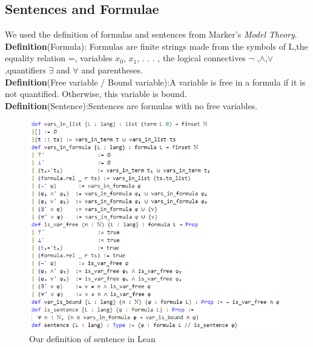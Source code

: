 \documentclass[landscape]{sciposter}
\begin{document}
\begin{multicols}{4}
\section*{Sentences and Formulae}
We used the definition of formulas and sentences from Marker's \textit{Model Theory}.\\
\textbf{Definition}(Formula): Formulas are finite strings made from the symbols of L,the equality relation =,  variables $x_0$, $x_1$, . . . , the logical connectives $\lnot$ ,$\wedge$,$\lor$,quantifiers $\exists$ and $\forall$ and parentheses.\\

\textbf{Definition}(Free variable / Bound variable):A variable is free in a formula if it is not quantified. Otherwise, this variable is bound.\\


\textbf{Definition}(Sentence):Sentences are formulas with no free variables.\\
\begin{center}\begin{figure}
\includegraphics[height = 9 in, width=1\textwidth, left]{sentence.png}
 	\caption{Our definition of sentence in Lean}


\end{figure}
\end{center}
\end{multicols}
\end{document}
